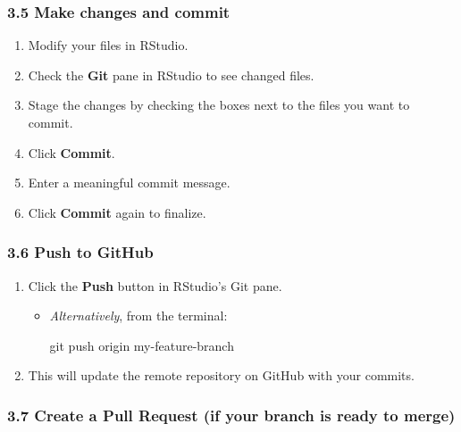 \documentclass[
  letterpaper,
  DIV=11,
  numbers=noendperiod]{scrartcl}
\newenvironment{Shaded}{\begin{snugshade}}{\end{snugshade}}
\newcommand{\FunctionTok}[1]{\textcolor[rgb]{0.28,0.35,0.67}{#1}}
\newcommand{\NormalTok}[1]{\textcolor[rgb]{0.00,0.23,0.31}{#1}}
\providecommand{\tightlist}{%
  \setlength{\itemsep}{0pt}\setlength{\parskip}{0pt}}\usepackage{longtable,booktabs,array}
\begin{document}
\subsubsection{3.5 Make changes and
commit}\label{make-changes-and-commit}

\begin{enumerate}
\def\labelenumi{\arabic{enumi}.}
\tightlist
\item
  Modify your files in RStudio.\\
\item
  Check the \textbf{Git} pane in RStudio to see changed files.\\
\item
  Stage the changes by checking the boxes next to the files you want to
  commit.\\
\item
  Click \textbf{Commit}.\\
\item
  Enter a meaningful commit message.\\
\item
  Click \textbf{Commit} again to finalize.
\end{enumerate}

\subsubsection{3.6 Push to GitHub}\label{push-to-github}

\begin{enumerate}
\def\labelenumi{\arabic{enumi}.}
\tightlist
\item
  Click the \textbf{Push} button in RStudio's Git pane.

  \begin{itemize}
  \item
    \emph{Alternatively}, from the terminal:

\begin{Shaded}
\begin{Highlighting}[]
\FunctionTok{git}\NormalTok{ push origin my{-}feature{-}branch}
\end{Highlighting}
\end{Shaded}
  \end{itemize}
\item
  This will update the remote repository on GitHub with your commits.
\end{enumerate}

\subsubsection{3.7 Create a Pull Request (if your branch is ready to
merge)}\label{create-a-pull-request-if-your-branch-is-ready-to-merge}
\end{document}
